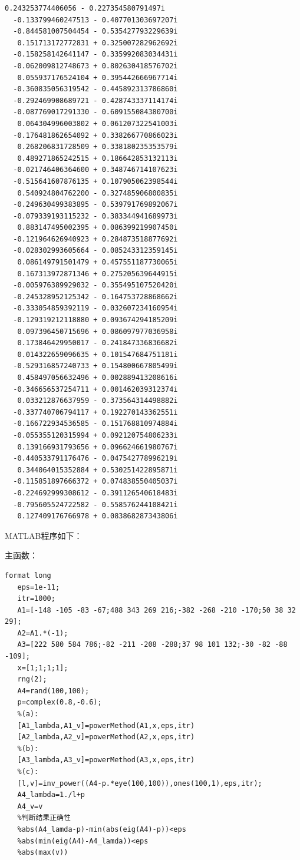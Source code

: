 \documentclass[12pt,a4paper,utf8]{ctexart}
\begin{document}
\begin{enumerate}
\begin{lstlisting}[frame=single]
   0.243253774406056 - 0.227354580791497i
  -0.133799460247513 - 0.407701303697207i
  -0.844581007504454 - 0.535427793229639i
   0.151713172772831 + 0.325007282962692i
  -0.158258142641147 - 0.335992083034431i
  -0.062009812748673 + 0.802630418576702i
   0.055937176524104 + 0.395442666967714i
  -0.360835056319542 - 0.445892313786860i
  -0.292469908689721 - 0.428743337114174i
  -0.087769017291330 - 0.609155084380700i
   0.064304996003802 + 0.061207322541003i
  -0.176481862654092 + 0.338266770866023i
   0.268206831728509 + 0.338180235353579i
   0.489271865242515 + 0.186642853132113i
  -0.021746406364600 + 0.348746714107623i
  -0.515641607876135 + 0.107905062398544i
   0.540924804762200 - 0.327485906800835i
  -0.249630499383895 - 0.539791769892067i
  -0.079339193115232 - 0.383344941689973i
   0.883147495002395 + 0.086399219907450i
  -0.121964626940923 + 0.284873518877692i
  -0.028302993605664 - 0.085243312359145i
   0.086149791501479 + 0.457551187730065i
   0.167313972871346 + 0.275205639644915i
  -0.005976389929032 - 0.355495107520420i
  -0.245328952125342 - 0.164753728868662i
  -0.333054859392119 - 0.032607234160954i
  -0.129319212118880 + 0.093674294185209i
   0.097396450715696 + 0.086097977036958i
   0.173846429950017 - 0.241847336836682i
   0.014322659096635 + 0.101547684751181i
  -0.529316857240733 + 0.154800667805499i
   0.458497056632496 + 0.002889413208616i
  -0.346656537254711 + 0.001462039312374i
   0.033212876637959 - 0.373564314498882i
  -0.337740706794117 + 0.192270143362551i
  -0.166722934536585 - 0.151768810974884i
  -0.055355120315994 + 0.092120754806233i
   0.139166931793656 + 0.096624661980767i
  -0.440533791176476 - 0.047542778996219i
   0.344064015352884 + 0.530251422895871i
  -0.115851897666372 + 0.074838550405037i
  -0.224692999308612 - 0.391126540618483i
  -0.795605524722582 - 0.558576244108421i
   0.127409176766978 + 0.083868287343806i
\end{lstlisting}

MATLAB程序如下：

主函数：
\begin{lstlisting}[frame=single]
   format long
   eps=1e-11;
   itr=1000;
   A1=[-148 -105 -83 -67;488 343 269 216;-382 -268 -210 -170;50 38 32 29];
   A2=A1.*(-1);
   A3=[222 580 584 786;-82 -211 -208 -288;37 98 101 132;-30 -82 -88 -109];
   x=[1;1;1;1];
   rng(2);
   A4=rand(100,100);
   p=complex(0.8,-0.6);
   %(a):
   [A1_lambda,A1_v]=powerMethod(A1,x,eps,itr)
   [A2_lambda,A2_v]=powerMethod(A2,x,eps,itr)
   %(b):
   [A3_lambda,A3_v]=powerMethod(A3,x,eps,itr)
   %(c):
   [l,v]=inv_power((A4-p.*eye(100,100)),ones(100,1),eps,itr);
   A4_lambda=1./l+p
   A4_v=v
   %判断结果正确性
   %abs(A4_lamda-p)-min(abs(eig(A4)-p))<eps
   %abs(min(eig(A4)-A4_lamda))<eps   
   %abs(max(v))
\end{lstlisting}


\end{enumerate}
\end{document}
